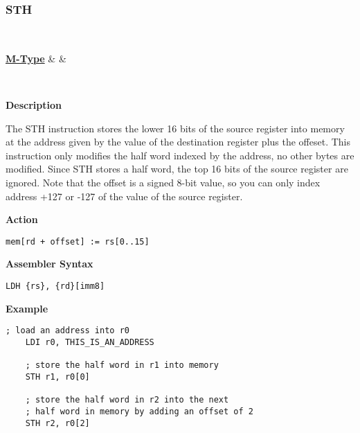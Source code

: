 \subsubsection{STH }\label{sec:STH}

\vspace{3ex}

\begin{center}
	\begin{bytefield}[leftcurly=., leftcurlyspace=0pt]{32}
		 \\
		\begin{leftwordgroup}{\hyperref[sec:m-type]{\textbf{M-Type}}}
		 & 
		 &
		\end{leftwordgroup}\\
	\end{bytefield}
\end{center}

\textbf{Description}

The STH instruction stores the lower 16 bits of the source register into memory at the address given by the value of the destination register plus the offeset.
This instruction only modifies the half word indexed by the address, no other bytes are modified.
Since STH stores a half word, the top 16 bits of the source register are ignored.
Note that the offset is a signed 8-bit value, so you can only index address +127 or -127 of the value of the source register.

\vspace{3ex}

\textbf{Action}
\begin{lstlisting}[frame=single]
	mem[rd + offset] := rs[0..15]
\end{lstlisting}

\vspace{3ex}

\textbf{Assembler Syntax}
\begin{lstlisting}[frame=single]
	LDH {rs}, {rd}[imm8]
\end{lstlisting}

\vspace{3ex}

\textbf{Example}
\begin{lstlisting}[frame=single]
	; load an address into r0
	LDI r0, THIS_IS_AN_ADDRESS
	
	; store the half word in r1 into memory
	STH r1, r0[0]
	
	; store the half word in r2 into the next
	; half word in memory by adding an offset of 2
	STH r2, r0[2]
\end{lstlisting}


